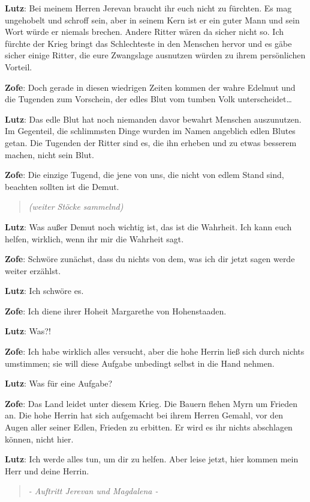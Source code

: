 \documentclass[a5paper,7pt, twocolumn]{book}
\begin{document}
\textbf{Lutz}: Bei meinem Herren Jerevan braucht ihr euch nicht zu fürchten. Es mag ungehobelt und schroff sein, aber in seinem Kern ist er ein guter Mann und sein Wort würde er niemals brechen.
Andere Ritter wären da sicher nicht so. Ich fürchte der Krieg bringt das Schlechteste in den Menschen hervor und es gäbe sicher einige Ritter, die eure Zwangslage ausnutzen würden zu ihrem persönlichen Vorteil.

\textbf{Zofe}: Doch gerade in diesen wiedrigen Zeiten kommen der wahre Edelmut und die Tugenden zum Vorschein, der edles Blut vom tumben Volk unterscheidet…

\textbf{Lutz}: Das edle Blut hat noch niemanden davor bewahrt Menschen auszunutzen. Im Gegenteil, die schlimmsten Dinge wurden im Namen angeblich edlen Blutes getan.
Die Tugenden der Ritter sind es, die ihn erheben und zu etwas besserem machen, nicht sein Blut.

\textbf{Zofe}: Die einzige Tugend, die jene von uns, die nicht von edlem Stand sind, beachten sollten ist die Demut.

\begin{quote}
  \textit{(weiter Stöcke sammelnd)}
 \end{quote}


\textbf{Lutz}: Was außer Demut noch wichtig ist, das ist die Wahrheit. Ich kann euch helfen, wirklich, wenn ihr mir die Wahrheit sagt.

\textbf{Zofe}: Schwöre zunächst, dass du nichts von dem, was ich dir jetzt sagen werde weiter erzählst.

\textbf{Lutz}: Ich schwöre es.

\textbf{Zofe}: Ich diene ihrer Hoheit Margarethe von Hohenstaaden.

\textbf{Lutz}: Was?!

\textbf{Zofe}: Ich habe wirklich alles versucht, aber die hohe Herrin ließ sich durch nichts umstimmen; sie will diese Aufgabe unbedingt selbst in die Hand nehmen.

\textbf{Lutz}: Was für eine Aufgabe?

\textbf{Zofe}: Das Land leidet unter diesem Krieg. Die Bauern flehen Myrn um Frieden an. Die hohe Herrin hat sich aufgemacht bei ihrem Herren Gemahl, vor den Augen aller seiner Edlen, Frieden zu erbitten. Er wird es ihr nichts abschlagen können, nicht hier.

\textbf{Lutz}: Ich werde alles tun, um dir zu helfen. Aber leise jetzt, hier kommen mein Herr und deine Herrin.

\begin{quote}
  \textit{- Auftritt Jerevan und Magdalena -}
 \end{quote}
\end{document}
